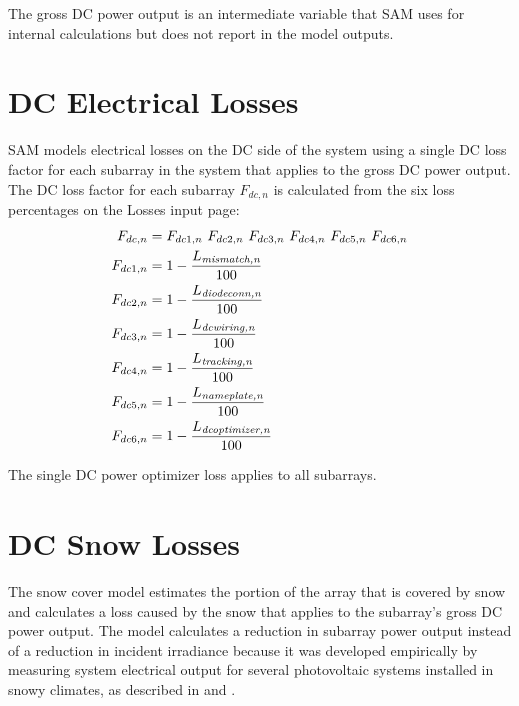 \documentclass[12pt,letterpaper]{article}
\begin{document}
The gross DC power output is an intermediate variable that SAM uses for internal calculations but does not report in the model outputs.

\section{DC Electrical Losses} \label{sec-dclosses}

SAM models electrical losses on the DC side of the system using a single DC loss factor for each subarray in the system that applies to the gross DC power output. The DC loss factor for each subarray $F_{dc,n}$ is calculated from the six loss percentages on the Losses input page:
\begin{align}\label{eqn-dcderate}
F_{dc,n} &= F_{dc1,n}~F_{dc2,n}~F_{dc3,n}~F_{dc4,n}~F_{dc5,n}~F_{dc6,n} \notag\\
F_{dc1,n} &= 1-\frac{L_{\textit{mismatch,n}}}{100} \notag\\
F_{dc2,n} &= 1-\frac{L_{\textit{diodeconn,n}}}{100} \notag\\
F_{dc3,n} &= 1-\frac{L_{\textit{dcwiring,n}}}{100} \notag\\
F_{dc4,n} &= 1-\frac{L_{\textit{tracking,n}}}{100} \notag\\
F_{dc5,n} &= 1-\frac{L_{\textit{nameplate,n}}}{100} \notag\\
F_{dc6,n} &= 1-\frac{L_{\textit{dcoptimizer,n}}}{100}
\end{align}

The single DC power optimizer loss applies to all subarrays.

\section{DC Snow Losses}\label{sec-snow}

The snow cover model estimates the portion of the array that is covered by snow and calculates a loss caused by the snow that applies to the subarray's gross DC power output. The model calculates a reduction in subarray power output instead of a reduction in incident irradiance because it was developed empirically by measuring system electrical output for several photovoltaic systems installed in snowy climates, as described in \citet{marion-snowmodel} and \citet{ryberg-snowmodel}.
\end{document}
